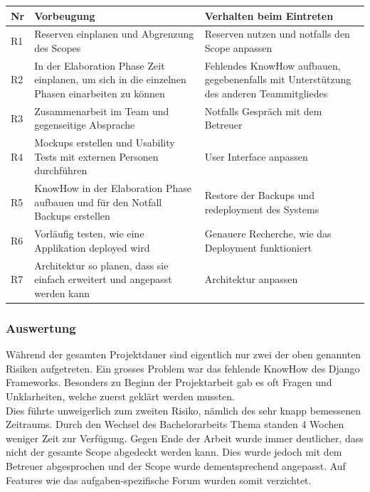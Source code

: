 \renewcommand{\arraystretch}{1.2}
\begin{table}[H]
	\centering
	\begin{tabu} to 0.9\textwidth {l X X}
	\toprule
	Nr & Vorbeugung & Verhalten beim Eintreten \\ 
	\midrule
	R1 & Reserven einplanen und Abgrenzung des Scopes & Reserven nutzen und notfalls den Scope anpassen \\
	R2 & In der Elaboration Phase Zeit einplanen, um sich in die einzelnen Phasen einarbeiten zu können & Fehlendes KnowHow aufbauen, gegebenenfalls mit Unterstützung des anderen Teammitgliedes \\
	R3 & Zusammenarbeit im Team und gegenseitige Absprache & Notfalls Gespräch mit dem Betreuer \\
	R4 & Mockups erstellen und Usability Tests mit externen Personen durchführen & User Interface anpassen \\
	R5 & KnowHow in der Elaboration Phase aufbauen und für den Notfall Backups erstellen & Restore der Backups und redeployment des Systems \\
	R6 & Vorläufig testen, wie eine Applikation deployed wird & Genauere Recherche, wie das Deployment funktioniert \\
	R7 & Architektur so planen, dass sie einfach erweitert und angepasst werden kann & Architektur anpassen \\
	\bottomrule
	\end{tabu}
\end{table}

\subsubsection*{Auswertung}
Während der gesamten Projektdauer sind eigentlich nur zwei der oben genannten Risiken aufgetreten. Ein grosses Problem war das fehlende KnowHow des Django Frameworks. Besonders zu Beginn der Projektarbeit gab es oft Fragen und Unklarheiten, welche zuerst geklärt werden mussten. \\
Dies führte unweigerlich zum zweiten Risiko, nämlich des sehr knapp bemessenen Zeitraums. Durch den Wechsel des Bachelorarbeits Thema standen 4 Wochen weniger Zeit zur Verfügung. Gegen Ende der Arbeit wurde immer deutlicher, dass nicht der gesamte Scope abgedeckt werden kann. Dies wurde jedoch mit dem Betreuer abgesprochen und der Scope wurde dementsprechend angepasst. Auf Features wie das aufgaben-spezifische Forum wurden somit verzichtet.

